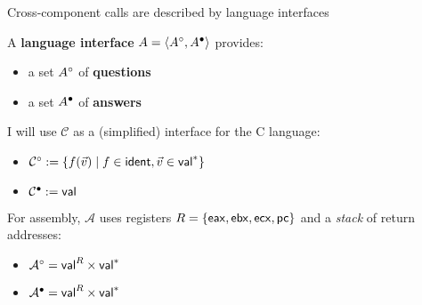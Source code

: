 \documentclass[aspectratio=169,mathserif]{beamer}
\begin{document}
\begin{frame}{Cross-component calls are described by language interfaces} %
  \begin{definition}
    A \textbf{language interface} $A = \langle A^\circ, A^\bullet \rangle$ provides:
    \begin{itemize}
      \item a set $A^\circ$ of \textbf{questions}
      \item a set $A^\bullet$ of \textbf{answers}
    \end{itemize}
  \end{definition}

  \pause
  \begin{example}
    I will use $\mathcal{C}$ %
    as a (simplified) interface for the C language:
    \begin{itemize}
      \item {}
        $\mathcal{C}^\circ :=
        \{ f(\vec{v}) \mid f \in  \mathsf{ident} , \vec{v} \in  \mathsf{val} ^* \}$
      \item {}
        $\mathcal{C}^\bullet :=  \mathsf{val} $
    \end{itemize}
    \pause
    For assembly,
    $\mathcal{A}$ %
    uses registers $R = \{  \mathsf{eax} ,  \mathsf{ebx} ,  \mathsf{ecx} ,  \mathsf{pc}  \}$
    and a \emph{stack} of return addresses:
    \begin{itemize}
      \item {}
        $\mathcal{A}^\circ =
          \mathsf{val} ^R \times  \mathsf{val} ^*$
      \item {}
        $\mathcal{A}^\bullet =
          \mathsf{val} ^R \times  \mathsf{val} ^*$
    \end{itemize}
  \end{example}
\end{frame}
\end{document}
